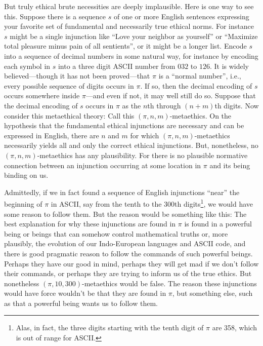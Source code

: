 But truly ethical brute necessities are deeply implausible. Here is one way to see this. Suppose there is a sequence $s$ of one or more English sentences expressing your 
favorite set of fundamental and necessarily true ethical norms. For instance $s$ might be a single injunction like ``Love your neighbor as yourself'' or ``Maximize total pleasure minus 
pain of all sentients'', or it might be a longer list. Encode $s$ into a sequence of decimal numbers in some natural way, for instance by encoding each symbol in
$s$ into a three digit ASCII number from $032$ to $126$. It is widely believed---though it has not been proved---that $\pi$ is a ``normal number'', i.e., every possible sequence of
digits occurs in $\pi$. If so, then the decimal encoding of $s$ occurs somewhere inside $\pi$---and even if not, it may well still do so. Suppose that the decimal
encoding of $s$ occurs in $\pi$ as the $n$th through $(n+m)$th digits. Now consider this metaethical theory: 
Call this $(\pi,n,m)$-metaethics. On the hypothesis that the fundamental ethical injunctions are necessary and can be expressed in English, there are $n$ and $m$ for which $(\pi,n,m)$-metaethics necessarily
yields all and only the correct ethical injunctions. But, nonetheless, no $(\pi,n,m)$-metaethics 
has any plausibility. For there is no plausible normative connection between an injunction occurring at some
location in $\pi$ and its being binding on us.

Admittedly, if we in fact found a sequence of English injunctions ``near'' the beginning of $\pi$ in ASCII, say from the tenth to the 300th digits\footnote{Alas, in fact, the three digits starting with the tenth digit of $\pi$ are 358, which is out of range for ASCII.}, we would have some reason 
to follow them. But the reason would be something like this: The best explanation for why these injunctions are found in $\pi$ is found in a powerful being or beings that
can somehow control mathematical truths or, more plausibly, the evolution of our Indo-European languages 
and ASCII code, and there is good pragmatic reason to follow the commands of such powerful beings. Perhaps they have
our good in mind, perhaps they will get mad if we don't follow their commands, or perhaps they are trying to inform us of the true ethics. But nonetheless
$(\pi,10,300)$-metaethics would be false. The reason these injunctions would have force wouldn't be that they are 
found in $\pi$, but something else, such as that a powerful being wants us to follow them.

